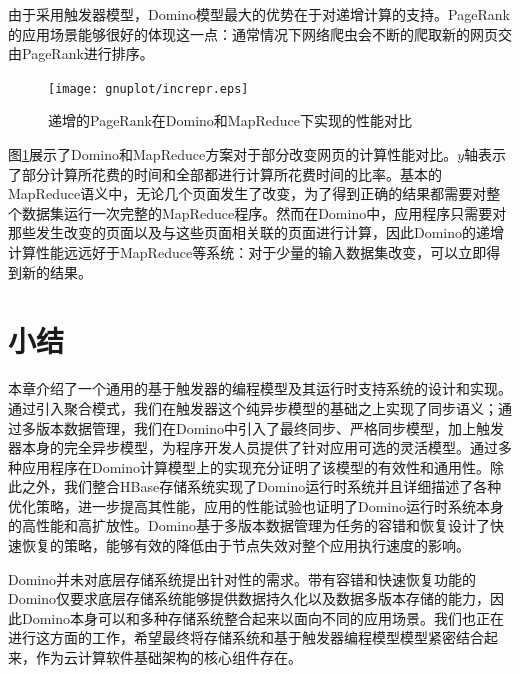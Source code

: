 由于采用触发器模型，Domino模型最大的优势在于对递增计算的支持。PageRank的应用场景能够很好的体现这一点：通常情况下网络爬虫会不断的爬取新的网页交由PageRank进行排序。

\begin{figure}[h!]
  \centering
  \texttt{[image: gnuplot/increpr.eps]}
  \caption{递增的PageRank在Domino和MapReduce下实现的性能对比}
  \label{incr}
\end{figure}

图\ref{incr}展示了Domino和MapReduce方案对于部分改变网页的计算性能对比。$y$轴表示了部分计算所花费的时间和全部都进行计算所花费时间的比率。基本的MapReduce语义中，无论几个页面发生了改变，为了得到正确的结果都需要对整个数据集运行一次完整的MapReduce程序。然而在Domino中，应用程序只需要对那些发生改变的页面以及与这些页面相关联的页面进行计算，因此Domino的递增计算性能远远好于MapReduce等系统：对于少量的输入数据集改变，可以立即得到新的结果。

\section{小结}
本章介绍了一个通用的基于触发器的编程模型及其运行时支持系统的设计和实现。通过引入聚合模式，我们在触发器这个纯异步模型的基础之上实现了同步语义；通过多版本数据管理，我们在Domino中引入了最终同步、严格同步模型，加上触发器本身的完全异步模型，为程序开发人员提供了针对应用可选的灵活模型。通过多种应用程序在Domino计算模型上的实现充分证明了该模型的有效性和通用性。除此之外，我们整合HBase存储系统实现了Domino运行时系统并且详细描述了各种优化策略，进一步提高其性能，应用的性能试验也证明了Domino运行时系统本身的高性能和高扩放性。Domino基于多版本数据管理为任务的容错和恢复设计了快速恢复的策略，能够有效的降低由于节点失效对整个应用执行速度的影响。

Domino并未对底层存储系统提出针对性的需求。带有容错和快速恢复功能的Domino仅要求底层存储系统能够提供数据持久化以及数据多版本存储的能力，因此Domino本身可以和多种存储系统整合起来以面向不同的应用场景。我们也正在进行这方面的工作，希望最终将存储系统和基于触发器编程模型模型紧密结合起来，作为云计算软件基础架构的核心组件存在。

